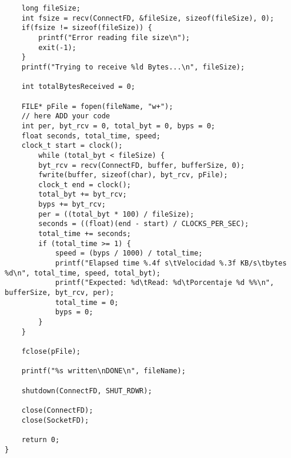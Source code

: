 \documentclass[12pt, letterpaper]{article}
\begin{document}
\begin{appendices}
\begin{verbatim}
	long fileSize;
	int fsize = recv(ConnectFD, &fileSize, sizeof(fileSize), 0);
	if(fsize != sizeof(fileSize)) {
		printf("Error reading file size\n");
		exit(-1);
	}
	printf("Trying to receive %ld Bytes...\n", fileSize);
	
	int totalBytesReceived = 0;
	
	FILE* pFile = fopen(fileName, "w+");
	// here ADD your code
	int per, byt_rcv = 0, total_byt = 0, byps = 0;
	float seconds, total_time, speed;
	clock_t start = clock();
		while (total_byt < fileSize) {  	
		byt_rcv = recv(ConnectFD, buffer, bufferSize, 0);    
		fwrite(buffer, sizeof(char), byt_rcv, pFile);
		clock_t end = clock();
		total_byt += byt_rcv;
		byps += byt_rcv;
		per = ((total_byt * 100) / fileSize);
		seconds = ((float)(end - start) / CLOCKS_PER_SEC);
		total_time += seconds;
		if (total_time >= 1) {
			speed = (byps / 1000) / total_time;
			printf("Elapsed time %.4f s\tVelocidad %.3f KB/s\tbytes %d\n", total_time, speed, total_byt);
			printf("Expected: %d\tRead: %d\tPorcentaje %d %%\n", bufferSize, byt_rcv, per);
			total_time = 0;
			byps = 0;
		}	
	}
	
	fclose(pFile);
	
	printf("%s written\nDONE\n", fileName);
	
	shutdown(ConnectFD, SHUT_RDWR);
	
	close(ConnectFD);
	close(SocketFD);
	
	return 0;
}
\end{verbatim}
\end{appendices}
\end{document}
